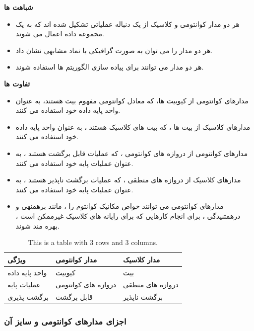 \documentclass{book}
\begin{document}
\textbf{شباهت ها}

\begin{itemize}
	\item هر دو مدار کوانتومی و کلاسیک از یک دنباله عملیاتی تشکیل شده اند که به یک مجموعه داده اعمال می شوند.
	\item هر دو مدار را می توان به صورت گرافیکی با نماد مشابهی نشان داد.
	\item هر دو مدار می توانند برای پیاده سازی الگوریتم ها استفاده شوند.
\end{itemize}

\textbf{تفاوت ها}

\begin{itemize}
	\item مدارهای کوانتومی از کیوبیت ها، که معادل کوانتومی مفهوم بیت هستند، به عنوان واحد پایه داده خود استفاده می کنند. 
	\item مدارهای کلاسیک از بیت ها ، که بیت های کلاسیک هستند ، به عنوان واحد پایه داده خود استفاده می کنند.
	\item مدارهای کوانتومی از دروازه های کوانتومی ، که عملیات قابل برگشت هستند ، به عنوان عملیات پایه خود استفاده می کنند.
	\item  مدارهای کلاسیک از دروازه های منطقی ، که عملیات برگشت ناپذیر هستند ، به عنوان عملیات پایه خود استفاده می کنند.
	\item مدارهای کوانتومی می توانند خواص مکانیک کوانتوم را ، مانند برهمنهی و درهمتنیدگی ، برای انجام کارهایی که برای رایانه های کلاسیک غیرممکن است ، بهره مند شوند.
\end{itemize}



\begin{table}[ht]
	\centering
	\begin{tabular}{|p{100pt}|p{100pt}|p{100pt}|}
		\hline
		ویژگی & مدار کوانتومی &مدار کلاسیک \\
		\hline
		واحد پایه داده & کیوبیت & بیت \\
		\hline
	      عملیات پایه & دروازه های کوانتومی & دروازه های منطقی \\
		\hline
		برگشت پذیری & قابل برگشت & برگشت ناپذیر \\
		\hline
	\end{tabular}
	\caption{This is a table with 3 rows and 3 columns.}
\end{table}



\subsubsection{اجزای مدار‌های کوانتومی و سایز آن }
\end{document}
